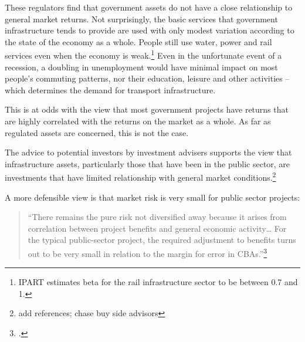 These regulators find that government assets do not have a close relationship to general market returns. Not surprisingly, the basic services that government infrastructure tends to provide are used with only modest variation according to the state of the economy as a whole. People still use water, power and rail services even when the economy is weak.\footnote{IPART estimates beta for the rail infrastructure sector to be between 0.7 and 1.}  Even in the unfortunate event of a recession, a doubling in unemployment would have minimal impact on most people’s commuting patterns, nor their education, leisure and other activities – which determines the demand for transport infrastructure.

This is at odds with the view that most government projects have returns that are highly correlated with the returns on the market as a whole. As far as regulated assets are concerned, this is not the case.

The advice to potential investors by investment advisers supports the view that infrastructure assets, particularly those that have been in the public sector, are investments that have limited relationship with general market conditions.\footnote{add references; chase buy side advisors}    

A more defensible view is that market risk is very small for public sector projects:

\begin{quote}
“There remains the pure risk not diversified away because it arises from correlation between project benefits and general economic activity… For the typical public-sector project, the required adjustment to benefits turns out to be very small in relation to the margin for error in CBAs.”\footcite[][v]{BITRE2005RiskinCostBenefitAnalysis} 
\end{quote}





